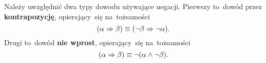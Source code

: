 \documentclass[a4paper,11pt]{article}
\begin{document}



\start {} Należy uwzględnić dwa typy dowodu używające negacji. Pierwszy to~dowód przez \textbf{kontrapozycję}, opierający~się na~tożsamości
\begin{equation}
  \label{eq:1}
  ( \alpha \Rightarrow \beta ) \equiv ( \neg \beta \Rightarrow \neg \alpha).
\end{equation}
Drugi to~dowód \textbf{nie wprost}, opierający~się na~tożsamości
\begin{equation}
  \label{eq:2}
  ( \alpha \Rightarrow \beta ) \equiv \neg ( \alpha \land \neg \beta ).
\end{equation}

\vspace{\spaceFour}
\end{document}
